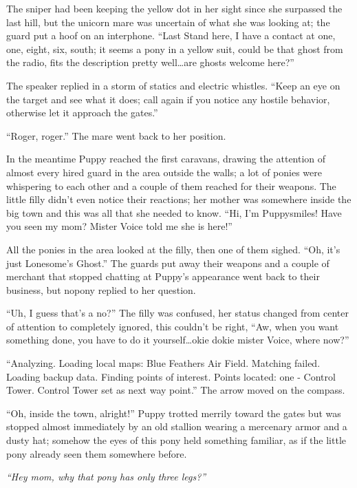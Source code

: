 
The sniper had been keeping the yellow dot in her sight since she surpassed the last hill, but the unicorn mare was uncertain of what she was looking at; the guard put a hoof on an interphone. ``Last Stand here, I have a contact at one, one, eight, six, south; it seems a pony in a yellow suit, could be that ghost from the radio, fits the description pretty well\dots are ghosts welcome here?''

The speaker replied in a storm of statics and electric whistles. ``Keep an eye on the target and see what it does; call again if you notice any hostile behavior, otherwise let it approach the gates.''

``Roger, roger.'' The mare went back to her position.

In the meantime Puppy reached the first caravans, drawing the attention of almost every hired guard in the area outside the walls; a lot of ponies were whispering to each other and a couple of them reached for their weapons. The little filly didn't even notice their reactions; her mother was somewhere inside the big town and this was all that she needed to know. ``Hi, I'm Puppysmiles! Have you seen my mom? Mister Voice told me she is here!''

All the ponies in the area looked at the filly, then one of them sighed. ``Oh, it's just Lonesome's Ghost.'' The guards put away their weapons and a couple of merchant that stopped chatting at Puppy's appearance went back to their business, but nopony replied to her question.

``Uh, I guess that's a no?'' The filly was confused, her status changed from center of attention to completely ignored, this couldn't be right, ``Aw, when you want something done, you have to do it yourself\dots okie dokie mister Voice, where now?''

``{\mt Analyzing. Loading local maps: Blue Feathers Air Field. Matching failed. Loading backup data. Finding points of interest. Points located: one - Control Tower. Control Tower set as next way point.}'' The arrow moved on the compass.

``Oh, inside the town, alright!'' Puppy trotted merrily toward the gates but was stopped almost immediately by an old stallion wearing a mercenary armor and a dusty hat; somehow the eyes of this pony held something familiar, as if the little pony already seen them somewhere before.

\emph{``Hey mom, why that pony has only three legs?''}

